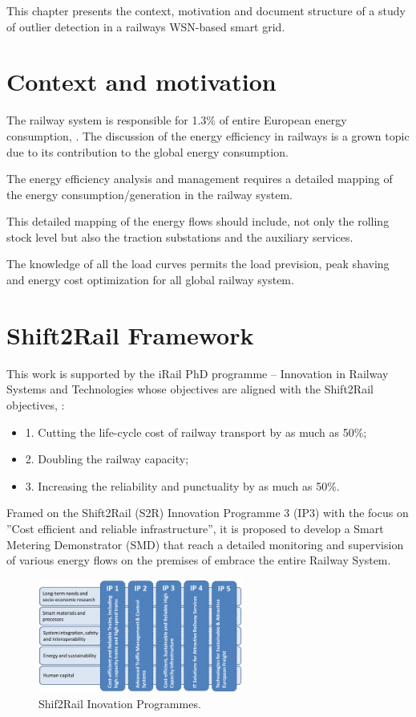 This chapter presents the context, motivation and document structure of a study of outlier detection in a railways WSN-based smart grid. 

\section{Context and motivation}

The railway system is responsible for 1.3\% of entire European energy consumption, \cite{iea-uic2016}. 
The discussion of the energy efficiency in railways is a grown topic due to its contribution to the global energy consumption.

The energy efficiency analysis and management requires a detailed mapping of the energy consumption/generation in the railway system. 

This detailed mapping of the energy flows should include, not only the rolling stock level but also the traction substations and the auxiliary services.

The knowledge of all the load curves permits the load prevision, peak shaving and energy cost optimization for all global railway system.


\section{Shift2Rail Framework}

This work is supported by the iRail PhD programme – Innovation in Railway Systems and Technologies whose objectives are aligned with the Shift2Rail objectives, \cite{shift2rail2015}: 

\begin{itemize}
		\setlength\itemsep{-0.5em}
		\item 1. Cutting the life-cycle cost of railway transport by as much as 50\%;
		\item 2. Doubling the railway capacity;
		\item 3. Increasing the reliability and punctuality by as much as 50\%.
\end{itemize}


Framed on the Shift2Rail (S2R) Innovation Programme 3 (IP3) with the focus on ”Cost efficient and reliable infrastructure”, it is proposed to develop a Smart Metering Demonstrator (SMD) that reach a detailed monitoring and supervision of various energy flows on the premises of embrace the entire Railway System.

\begin{figure}[h!]
	\centering
	\includegraphics[width=0.60\textwidth,keepaspectratio]{figures/IPs}
	\caption{Shif2Rail Inovation Programmes. }
	\label{fig:ips}
\end{figure}

